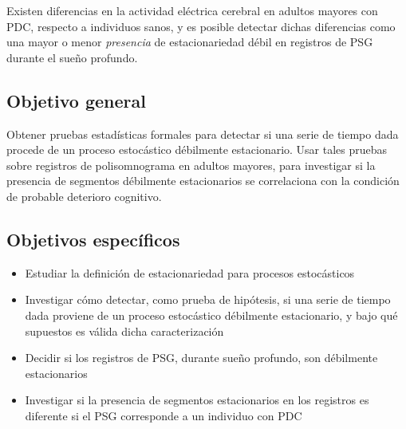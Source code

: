 Existen diferencias en la actividad eléctrica cerebral en adultos mayores con PDC, respecto a 
individuos sanos, y es posible detectar dichas diferencias como una mayor o menor 
\textit{presencia} de estacionariedad débil en registros de PSG durante el sueño profundo.


\subsection{Objetivo general}

Obtener pruebas estadísticas formales para detectar si una serie de tiempo dada procede de un
proceso estocástico débilmente estacionario.
%
Usar tales pruebas sobre registros de polisomnograma en adultos mayores, para investigar si la 
presencia de segmentos débilmente estacionarios se correlaciona con la condición de probable
deterioro cognitivo.


\subsection{Objetivos específicos}

\begin{itemize}
\item Estudiar la definición de estacionariedad para procesos estocásticos

\item Investigar cómo detectar, como prueba de hipótesis, si una serie de tiempo dada proviene
de un proceso estocástico débilmente estacionario, y bajo qué supuestos 
es válida dicha caracterización

\item Decidir si los registros de PSG, durante sueño profundo, son débilmente estacionarios

\item Investigar si la presencia de segmentos estacionarios en los registros es diferente si el
PSG corresponde a un individuo con PDC
\end{itemize}

